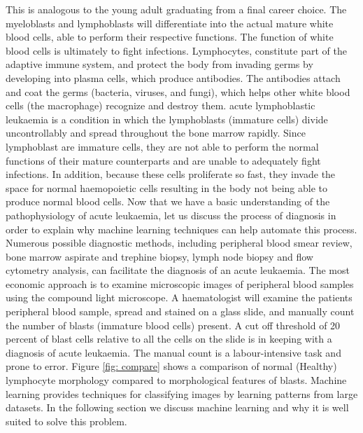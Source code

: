 \documentclass[a4paper,11pt]{article}
\begin{document}
This is analogous to the young adult graduating from a final career choice. 
The myeloblasts and lymphoblasts will differentiate into the actual mature white blood cells, able to perform their respective functions. The function of white blood cells is ultimately to fight infections. Lymphocytes, constitute part of the adaptive immune system, and protect the body from invading germs by developing into plasma cells, which produce antibodies. The antibodies attach and coat the germs (bacteria, viruses, and fungi), which helps other white blood cells (the macrophage) recognize and destroy them. acute lymphoblastic leukaemia is a condition in which the lymphoblasts (immature cells) divide uncontrollably and spread throughout the bone marrow rapidly. Since lymphoblast are immature cells, they are not able to perform the normal functions of their mature counterparts and are unable to adequately fight infections. In addition, because these cells proliferate so fast, they invade the space for normal haemopoietic cells resulting in the body not being able to produce normal blood cells. Now that we have a basic understanding of the pathophysiology of acute leukaemia, let us discuss the process of diagnosis in order to explain why machine learning techniques can help automate this
process. Numerous possible diagnostic methods, including peripheral blood smear review, bone
marrow aspirate and trephine biopsy, lymph node biopsy and flow cytometry analysis, can facilitate the diagnosis of an acute leukaemia. The most economic approach is to examine microscopic images of peripheral blood samples using the compound light microscope. A haematologist will examine the patients peripheral blood sample, spread and stained on a glass slide, and manually count the number of blasts (immature blood cells) present. A cut off threshold of 20 percent of blast cells relative to all the cells on the slide is in keeping with a diagnosis of acute leukaemia. The manual count is a labour-intensive task and prone to error. Figure \ref{fig: compare} shows a comparison of normal (Healthy) lymphocyte morphology compared to morphological features of blasts. Machine learning provides techniques for classifying images by learning patterns from large datasets. In the following section we discuss machine learning and why it is well suited to solve this problem.
\end{document}
